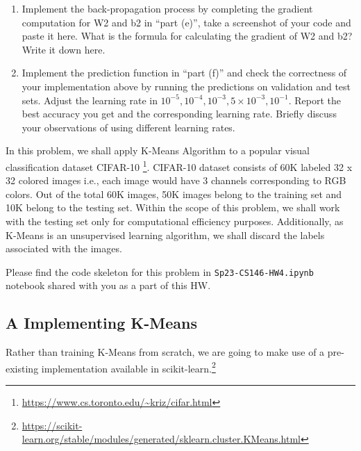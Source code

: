 \documentclass[11pt]{article}
\begin{document}
\begin{enumerate}
    \item {} Implement the back-propagation process by completing the gradient computation for W2 and b2 in ``part (e)'', take a screenshot of your code and paste it here. What is the formula for calculating the gradient of W2 and b2? Write it down here.\\
    \vspace{4cm}

    \item {} Implement the prediction function in ``part (f)'' and check the correctness of your implementation above by running the predictions on validation and test sets. Adjust the learning rate in $10^{-5}, 10^{-4}, 10^{-3}, 5\times10^{-3}, 10^{-1}$. Report the best accuracy you get and the corresponding learning rate. Briefly discuss your observations of using different learning rates.\\
    \vspace{4cm}

\end{enumerate}




In this problem, we shall apply K-Means Algorithm to a popular visual classification dataset CIFAR-10 \footnote{\url{https://www.cs.toronto.edu/~kriz/cifar.html}}. CIFAR-10 dataset consists of 60K labeled 32 x 32 colored images i.e., each image would have 3 channels corresponding to RGB colors.
Out of the total 60K images, 50K images belong to the training set and 10K belong to the testing set. Within the scope of this problem, we shall work with the testing set only for computational efficiency purposes. Additionally, as K-Means is an unsupervised learning algorithm, we shall discard the labels associated with the images.

Please find the code skeleton for this problem in \verb|Sp23-CS146-HW4.ipynb| notebook shared with you as a part of this HW.

\subsection*{A Implementing K-Means}
 Rather than training K-Means from scratch, we are going to make use of a pre-existing implementation available in scikit-learn.\footnote{\url{https://scikit-learn.org/stable/modules/generated/sklearn.cluster.KMeans.html}}
\end{document}
